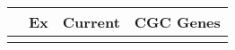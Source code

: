 \begin{tabular}{lccr}
\toprule
{} & Ex & Current & CGC Genes \\
\midrule
{} &    &         &           \\
\bottomrule
\end{tabular}
